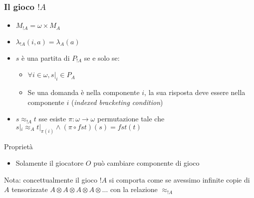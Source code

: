 \documentclass{beamer}
\begin{document}
\begin{frame}
	
	\frametitle{Il gioco $!A$}
	
	\begin{itemize}
		\item $M_{!A}=\omega \times M_A$
		\item $\lambda_{!A}(i,a)=\lambda_A(a)$
		\item $s$ è una partita di $P_{!A}$ se e solo se:
		\begin{itemize}
			\item $\forall i\in \omega , s|_i \in P_A$
			\item Se una domanda è nella componente $i$, la sua risposta deve essere nella componente $i$ (\emph{indexed bracketing condition})
		\end{itemize}

		\item $s\approx_{!A} t$ sse esiste $\pi:\omega \rightarrow \omega$ permutazione tale che $s|_i \approx_A t|_{\pi(i)} \wedge (\pi \circ fst)(s)=fst(t)$
	\end{itemize}
	
	\begin{block}{Proprietà}
		\begin{itemize}
			\item Solamente il giocatore $O$ può cambiare componente di gioco
		\end{itemize}
	\end{block}
	
	Nota: concettualmente il gioco $!A$ si comporta come se avessimo infinite copie di $A$ tensorizzate $A\otimes A\otimes A\otimes A\otimes \dots$ con la relazione $\approx_{!A}$
	
\end{frame}
\end{document}
